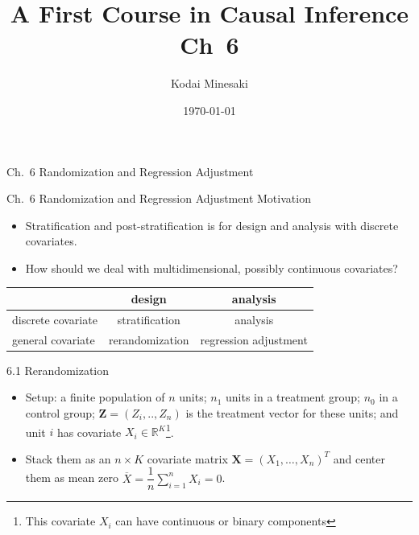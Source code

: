 \documentclass[aspectratio=169, 12pt]{beamer}
\title[]{A First Course in Causal Inference Ch~6}
\author[Kodai Minesaki]{Kodai Minesaki}
\institute[Faculty of Engineering, The University of Tokyo]{Faculty of Engineering, The University of Tokyo}
\date{\today}
\begin{document}
\begin{frame}
\titlepage
\end{frame}


\begin{frame}

  {
    \large
    Ch.~6 Randomization and Regression Adjustment
  }
  
\end{frame}

\begin{frame}{Ch.~6 Randomization and Regression Adjustment}
  Motivation
  \begin{itemize}
    \item Stratification and post-stratification is for design and analysis with discrete covariates.
    \item How should we deal with multidimensional, possibly continuous covariates?
  \end{itemize}
  \begin{table}
    \centering
    \begin{tabular}{lcc}
      \toprule
      & design & analysis \\
      \midrule
      discrete covariate & stratification & analysis \\
      general covariate & rerandomization & regression adjustment\\
      \bottomrule
    \end{tabular}
  \end{table}
\end{frame}

\begin{frame}{6.1 Rerandomization}
  \begin{itemize}
    \item Setup: a finite population of $n$ units; $n_1$ units in a treatment group; $n_0$ in a control group; $\bm{Z}=(Z_i,..,Z_n)$ is the treatment vector for these units; and unit $i$ has covariate $X_i\in \mathbb{R}^{K}$\footnote{This covariate $X_i$ can have continuous or binary components}.
    \item Stack them as an $n\times K$ covariate matrix $\bm{X}=(X_1, \dots,X_n)^{T}$ and center them as mean zero $\overline{X}=\dfrac{1}{n}\sum_{i=1}^{n}X_i=0$.
  \end{itemize}
\end{frame}
\end{document}
